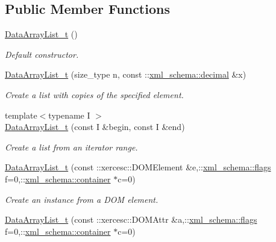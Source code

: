 \subsection*{Public Member Functions}
\begin{DoxyCompactItemize}
\item 
\hyperlink{classDataArrayList__t_a3ec10a5824450940e47a90c376fdb065}{Data\+Array\+List\+\_\+t} ()
\begin{DoxyCompactList}\small\item\em Default constructor. \end{DoxyCompactList}\item 
\hyperlink{classDataArrayList__t_ad821001ed5f5f94f06712f5b0acab874}{Data\+Array\+List\+\_\+t} (size\+\_\+type n, const \+::\hyperlink{namespacexml__schema_a69bfaf24f63a8c18ebd8e21db6b343df}{xml\+\_\+schema\+::decimal} \&x)
\begin{DoxyCompactList}\small\item\em Create a list with copies of the specified element. \end{DoxyCompactList}\item 
{\footnotesize template$<$typename I $>$ }\\\hyperlink{classDataArrayList__t_a7b3c40bcc5d41bafc235a30ffa1a3b8f}{Data\+Array\+List\+\_\+t} (const I \&begin, const I \&end)
\begin{DoxyCompactList}\small\item\em Create a list from an iterator range. \end{DoxyCompactList}\item 
\hyperlink{classDataArrayList__t_ab596ca97e9666c979d1db13a4e032869}{Data\+Array\+List\+\_\+t} (const \+::xercesc\+::\+D\+O\+M\+Element \&e,\+::\hyperlink{namespacexml__schema_a8d981c127a1f5106d04ad5853e707361}{xml\+\_\+schema\+::flags} f=0,\+::\hyperlink{namespacexml__schema_a395f5179c5fc4643909d66e9ff28d8ca}{xml\+\_\+schema\+::container} $\ast$c=0)
\begin{DoxyCompactList}\small\item\em Create an instance from a D\+O\+M element. \end{DoxyCompactList}\item 
\hyperlink{classDataArrayList__t_a4cae1891a3ad2b9336b478fa436f4d3f}{Data\+Array\+List\+\_\+t} (const \+::xercesc\+::\+D\+O\+M\+Attr \&a,\+::\hyperlink{namespacexml__schema_a8d981c127a1f5106d04ad5853e707361}{xml\+\_\+schema\+::flags} f=0,\+::\hyperlink{namespacexml__schema_a395f5179c5fc4643909d66e9ff28d8ca}{xml\+\_\+schema\+::container} $\ast$c=0)

\end{DoxyCompactItemize}
